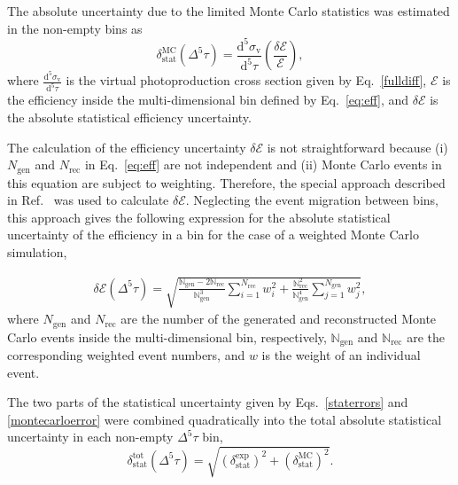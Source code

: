 \documentclass[prc,twocolumn,superscriptaddress,showpacs,amssymb,amsmath,amsfonts,aps,nofootinbib]{revtex4-1}
\begin{document}
The absolute uncertainty due to the limited Monte Carlo statistics was estimated in the non-empty bins as 
\begin{equation}
\delta_{\text{stat}}^{\text{MC}}(\Delta^{5} \tau) = \frac{\textrm{d}^{5}\sigma_{\text{v}}}{\textrm{d}^{5}\tau} \left( \frac{\delta \mathcal{E}}{\mathcal{E}} \right),
\label{montecarloerror}
\end{equation}
where $\frac{\textrm{d}^{5}\sigma_{\text{v}}}{\textrm{d}^{5}\tau}$ is the virtual photoproduction cross section given by Eq.\!~\eqref{fulldiff}, $\mathcal{E}$ is the efficiency inside the multi-dimensional bin defined by Eq.\!~\eqref{eq:eff}, and $\delta \mathcal{E}$ is the absolute statistical efficiency uncertainty. 


The calculation of the efficiency uncertainty $\delta \mathcal{E}$ is not straightforward because (i) $N_{\text{gen}}$ and $N_{\text{rec}}$ in Eq.\!~\eqref{eq:eff} are not independent and (ii) Monte Carlo events in this equation are subject to weighting. Therefore, the special approach described in Ref.\!~\cite{Laforge:1996ts} was used to calculate $\delta \mathcal{E}$. Neglecting the event migration between bins, this approach gives the following expression for the absolute statistical uncertainty of the efficiency in a bin for the case of a weighted Monte Carlo simulation,



\begin{equation}
\begin{aligned}
\delta \mathcal{E}(\Delta^{5} \tau) = \sqrt{\frac{\mathbb{N}_{\text{gen}} - 2\mathbb{N}_{\text{rec}}}{\mathbb{N}_{\text{gen}}^{3}}\sum\limits_{i=1}^{N_{\text{rec}}} w_{i}^{2} + \frac{\mathbb{N}_{\text{rec}}^{2}}{\mathbb{N}_{\text{gen}}^{4}}\sum\limits_{j=1}^{N_{\text{gen}}} w_{j}^{2}},
\end{aligned}
\label{eq:eff_err_weighted}
\end{equation}
where $N_{\text{gen}}$ and $N_{\text{rec}}$ are the number of the generated and reconstructed Monte Carlo events inside the multi-dimensional bin, respectively, $\mathbb{N}_{\text{gen}}$ and  $\mathbb{N}_{\text{rec}}$ are the corresponding weighted event numbers, and $w$ is the weight of an individual event.


The two parts of the statistical uncertainty given by Eqs.\!~\eqref{staterrors} and \eqref{montecarloerror} were combined quadratically into the total absolute statistical uncertainty in each non-empty $\Delta^{5} \tau$ bin,
\begin{equation}
\delta_{\text{stat}}^{\text{tot}}(\Delta^{5} \tau) =
\sqrt{\left (\delta_{\text{stat}}^{\text{exp}} \right )^{2} + \left (\delta_{\text{stat}}^{\text{MC}}\right )^{2}}.
\label{errortot}
\end{equation}
\end{document}

